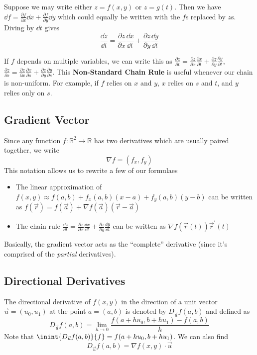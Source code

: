 \documentclass[12pt]{article}
\begin{document}
Suppose we may write either $z = f(x,y)$ or $z = g(t)$. Then we have $\dd f = \frac{\partial f}{\partial x} \dd x + \frac{\partial f}{\partial y} \dd y$ which could equally be written with the $f$s replaced by $z$s. Diving by $\dd t$ gives \[ \frac{\dd z}{\dd t} = \frac{\partial z}{\partial x} \frac{\dd x}{\dd t} + \frac{\partial z}{\partial y} \frac{\dd y}{\dd t} \]

If $f$ depends on multiple variables, we can write this as $\frac{\partial z}{\partial t} = \frac{\partial z}{\partial x} \frac{\partial x}{\partial t} + \frac{\partial z}{\partial y} \frac{\partial y}{\partial t}$, $\frac{\partial z}{\partial s} = \frac{\partial z}{\partial x} \frac{\partial x}{\partial s} + \frac{\partial z}{\partial y} \frac{\partial y}{\partial s}$. This {\bf Non-Standard Chain Rule} is useful whenever our chain is non-uniform. For example, if $f$ relies on $x$ and $y$, $x$ relies on $s$ and $t$, and $y$ relies only on $s$.

\subsection*{Gradient Vector}
Since any function $f: \mathbb{R}^2 \to \mathbb{R}$ has two derivatives which are usually paired together, we write \[ \nabla f = (f_x, f_y) \] This notation allows us to rewrite a few of our formulaes
\begin{itemize}
\item The linear approximation of $f(x,y) \approx f(a,b) + f_x(a,b)(x-a) + f_y(a,b)(y-b)$ can be written as $f(\vec{r}) = f(\vec{a}) + \nabla f(\vec{a})(\vec{r} - \vec{a})$
\item The chain rule $\frac{\dd z}{\dd t} = \frac{\partial z}{\partial x} \frac{\dd x}{\dd t} + \frac{\partial z}{\partial y} \frac{\dd y}{\dd t}$ can be written as $\nabla f(\vec{r}(t)) \vec{r}^\prime (t)$
\end{itemize}

Basically, the gradient vector acts as the ``complete'' derivative (since it's comprised of the \emph{partial} derivatives).

\subsection*{Directional Derivatives}
 The directional derivative of $f(x,y)$ in the direction of a unit vector $\vec{u} = (u_0, u_1)$ at the point $a = (a,b)$ is denoted by $D_{\vec{u}} f(a,b)$ and defined as \[ D_{\vec{u}} f(a,b) = \lim_{h\to 0} \frac{f(a + hu_0, b + hu_1) - f(a,b)}{h} \] Note that $\inint{D_{\vec{u}} f(a,b)}{f} = f(a + hu_0, b + hu_1)$. We can also find \[ D_{\vec{u}} f(a,b) = \nabla f(x,y) \cdot \vec{u} \]
\end{document}
